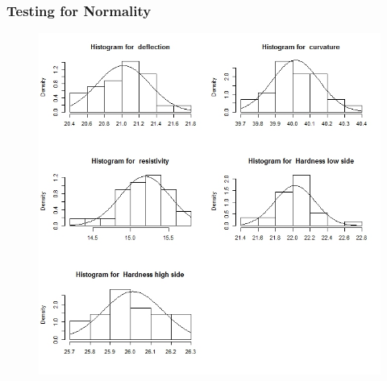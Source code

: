 \documentclass{beamer}
\begin{document}
\begin{frame}[fragile]
\frametitle{Testing for Normality}
\begin{figure}[h!]
\centering
\includegraphics[width=0.8\linewidth]{images/MSQC-bimetal1hist}
\end{figure}
	\end{frame}
	
\end{document}
